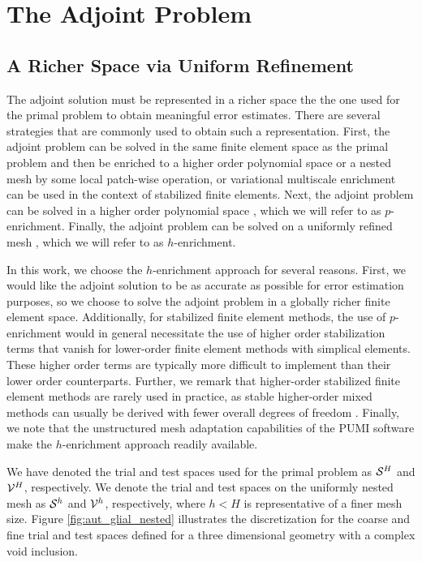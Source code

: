 \section{The Adjoint Problem}
\label{sec:aut_adjoint}

\subsection{A Richer Space via Uniform Refinement}

The adjoint solution must be represented in a richer
space the the one used for the primal problem to obtain meaningful error
estimates. There are several strategies that are commonly used to obtain
such a representation. First, the adjoint problem can be solved in the same
finite element space as the primal problem and then be enriched to a higher
order polynomial space \cite{becker2001optimal} or a nested mesh
\cite{nemec2007adjoint} by some local patch-wise operation, or variational
multiscale enrichment \cite{granzow2017output} can be used in the context
of stabilized finite elements. Next, the adjoint problem can be solved in a
higher order polynomial space \cite{fidkowski2011output}, which we will refer
to as $p$-enrichment. Finally, the adjoint problem can be solved on a
uniformly refined mesh \cite{burstedde2009parallel}, which we will refer to
as $h$-enrichment.

In this work, we choose the $h$-enrichment approach for several reasons.
First, we would like the adjoint solution to be as accurate as possible
for error estimation purposes, so we choose to solve the adjoint problem in
a globally richer finite element space. Additionally, for stabilized finite
element methods, the use of $p$-enrichment would in general necessitate the
use of higher order stabilization terms that vanish for lower-order finite
element methods with simplical elements. These higher order terms are
typically more difficult to implement than their lower order counterparts.
Further, we remark that higher-order stabilized finite element methods are
rarely used in practice, as stable higher-order mixed methods can usually
be derived with fewer overall degrees of freedom \cite{taylor1973numerical}.
Finally, we note that the unstructured mesh adaptation capabilities of the
PUMI software make the $h$-enrichment approach readily available.

We have denoted the trial and test spaces used for the primal problem
as $\S^H$ and $\V^H$, respectively. We denote the trial and test spaces on
the uniformly nested mesh as $\S^h$ and $\V^h$, respectively, where $h < H$
is representative of a finer mesh size. Figure \ref{fig:aut_glial_nested}
illustrates the discretization for the coarse and fine trial and test spaces
defined for a three dimensional geometry with a complex void inclusion.

